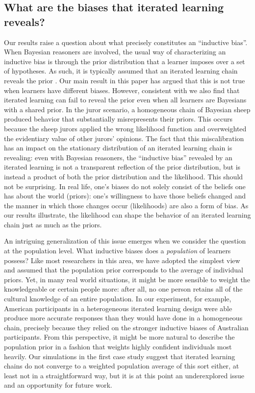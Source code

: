 \documentclass[doc]{apa6}
\begin{document}
\subsection{What are the biases that iterated learning reveals?}

Our results raise a question about what precisely constitutes an ``inductive bias''. When Bayesian reasoners are involved, the usual way of characterizing an inductive bias is through the prior distribution that a learner imposes over a set of hypotheses. As such, it is typically assumed that an iterated learning chain reveals the prior \parencite{griffiths_language_2007}. Our main result in this paper has argued that this is not true when learners have different biases. However, consistent with \textcite{smith2009iterated} we also find that iterated learning can fail to reveal the prior even when all learners are Bayesians with a shared prior. In the juror scenario, a homogeneous chain of Bayesian {\sc sheep} produced behavior that substantially misrepresents their priors. This occurs because the {\sc sheep} jurors applied the wrong likelihood function and overweighted the evidentiary value of other jurors' opinions. The fact that this miscalibration has an impact on the stationary distribution of an iterated learning chain is revealing: even with Bayesian reasoners, the ``inductive bias'' revealed by an iterated learning is not a transparent reflection of the prior distribution, but is instead a product of both the prior distribution and the likelihood. This should not be surprising. In real life, one's biases do not solely consist of the beliefs one has about the world (priors): one's willingness to have those beliefs changed and the manner in which those changes occur (likelihoods) are also a form of bias. As our results illustrate, the likelihood can shape the behavior of an iterated learning chain just as much as the priors.

An intriguing generalization of this issue emerges when we consider the question at the population level. What inductive biases does a {\it population} of learners possess? Like most researchers in this area, we have adopted the simplest view and assumed that the population prior corresponds to the average of individual priors. Yet, in many real world situations, it might be more sensible to weight the knowledgeable or certain people more: after all, no one person retains all of the cultural knowledge of an entire population. In our experiment, for example, American participants in a heterogeneous iterated learning design were able produce more accurate responses than they would have done in a homogeneous chain, precisely because they relied on the stronger inductive biases of Australian participants. From this perspective, it might be more natural to describe the population prior in a fashion that weights highly confident individuals most heavily. Our simulations in the first case study suggest that iterated learning chains do not converge to a weighted population average of this sort either, at least not in a straightforward way, but it is at this point an underexplored issue and an opportunity for future work.
\end{document}
